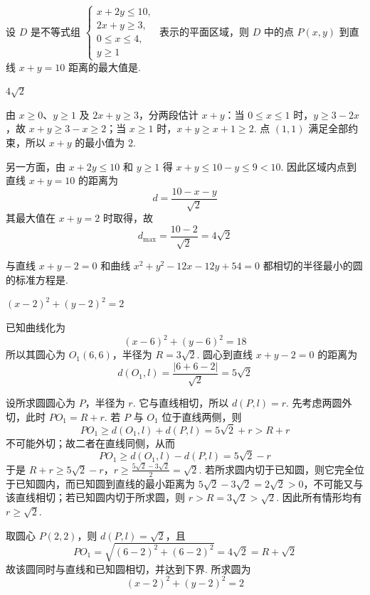 \begin{problem}
设 \(D\) 是不等式组 \(\begin{cases}
x + 2y \leqslant 10,\\
2x + y \geqslant 3,\\
0 \leqslant x \leqslant 4,\\
y \geqslant 1
\end{cases}\) 表示的平面区域，则 \(D\) 中的点 \(P(x, y)\) 到直线 \(x + y = 10\) 距离的最大值是\fillinblank{}.

\begin{answer}\(4\sqrt{2}\)\end{answer}

\begin{solution}
由 \(x\geqslant0\)、\(y\geqslant1\) 及 \(2x+y\geqslant3\)，分两段估计 \(x+y\)：当 \(0\leqslant x\leqslant1\) 时，\(y\geqslant3-2x\)，故 \(x+y\geqslant3-x\geqslant2\)；当 \(x\geqslant1\) 时，\(x+y\geqslant x+1\geqslant2\). 点 \((1,1)\) 满足全部约束，所以 \(x+y\) 的最小值为 \(2\).

另一方面，由 \(x+2y\leqslant10\) 和 \(y\geqslant1\) 得 \(x+y\leqslant10-y\leqslant9<10\). 因此区域内点到直线 \(x+y=10\) 的距离为
\[
d=\frac{10-x-y}{\sqrt{2}}
\]
其最大值在 \(x+y=2\) 时取得，故
\[
d_{\max}=\frac{10-2}{\sqrt{2}}=4\sqrt{2}
\]
\end{solution}
\end{problem}

\begin{problem}
与直线 \(x + y - 2 = 0\) 和曲线 \(x^{2} + y^{2} - 12x - 12y + 54 = 0\) 都相切的半径最小的圆的标准方程是\fillinblank{}.

\begin{answer}\(\left(x - 2\right)^2 + \left(y - 2\right)^2 = 2\)\end{answer}

\begin{solution}
已知曲线化为
\[
(x-6)^2+(y-6)^2=18
\]
所以其圆心为 \(O_1(6,6)\)，半径为 \(R=3\sqrt{2}\). 圆心到直线 \(x+y-2=0\) 的距离为
\[
d(O_1,l)=\frac{|6+6-2|}{\sqrt{2}}=5\sqrt{2}
\]

设所求圆圆心为 \(P\)，半径为 \(r\). 它与直线相切，所以 \(d(P,l)=r\). 先考虑两圆外切，此时 \(PO_1=R+r\). 若 \(P\) 与 \(O_1\) 位于直线两侧，则
\[
PO_1\geqslant d(O_1,l)+d(P,l)=5\sqrt{2}+r>R+r
\]
不可能外切；故二者在直线同侧，从而
\[
PO_1\geqslant d(O_1,l)-d(P,l)=5\sqrt{2}-r
\]
于是
\(R+r\geqslant5\sqrt{2}-r\)，\(r\geqslant\frac{5\sqrt{2}-3\sqrt{2}}{2}=\sqrt{2}\).
若所求圆内切于已知圆，则它完全位于已知圆内，而已知圆到直线的最小距离为 \(5\sqrt{2}-3\sqrt{2}=2\sqrt{2}>0\)，不可能又与该直线相切；若已知圆内切于所求圆，则 \(r>R=3\sqrt{2}>\sqrt{2}\). 因此所有情形均有 \(r\geqslant\sqrt{2}\).

取圆心 \(P(2,2)\)，则 \(d(P,l)=\sqrt{2}\)，且
\[
PO_1=\sqrt{(6-2)^2+(6-2)^2}=4\sqrt{2}=R+\sqrt{2}
\]
故该圆同时与直线和已知圆相切，并达到下界. 所求圆为
\[
(x-2)^2+(y-2)^2=2
\]
\end{solution}
\end{problem}

